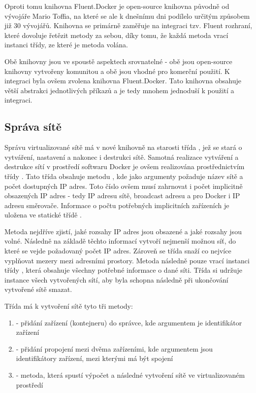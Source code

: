 Oproti tomu knihovna Fluent.Docker je open-source knihovna původně od vývojáře Mario Toffia, na které se ale k dnešnímu dni podílelo určitým způsobem již 30 vývojářů. Knihovna se primárně zaměřuje na integraci tzv. Fluent rozhraní, které dovoluje řetězit metody za sebou, díky tomu, že každá metoda vrací instanci třídy, ze které je metoda volána. \cite{fluentinterface}

Obě knihovny jsou ve spoustě aspektech srovnatelné - obě jsou open-source knihovny vytvořeny komunitou a obě jsou vhodné pro komerční použití. K integraci byla ovšem zvolena knihovna Fluent.Docker. Tato knihovna obsahuje větší abstrakci jednotlivých příkazů a je tedy mnohem jednoduší k použití a integraci.

\subsection{Správa sítě}

Správu virtualizované sítě má v nové knihovně na starosti třída , jež se stará o vytváření, nastavení a nakonec i destrukci sítě. 
Samotná realizace vytváření a destrukce sítí v prostředí softwaru Docker je ovšem realizována prostřednictvím třídy . Tato třída obsahuje metodu , kde jako argumenty požaduje název sítě a počet dostupných IP adres. Toto číslo ovšem musí zahrnovat i počet implicitně obsazených IP adres - tedy IP adresu sítě, broadcast adresu a pro Docker i IP adresu směrovače. Informace o počtu potřebných implicitních zařízeních je uložena ve statické třídě .

Metoda  nejdříve zjistí, jaké rozsahy IP adres jsou obsazené a jaké rozsahy jsou volné. Následně na základě těchto informací vytvoří nejmenší možnou síť, do které se vejde požadovaný počet IP adres. Zároveň se třída snaží co nejvíce vyplňovat mezery mezi adresními prostory. Metoda následně pouze vrací instanci třídy , která obsahuje všechny potřebné informace o dané síti. Třída  si udržuje instance všech vytvořených sítí, aby byla schopna následně při ukončování vytvořené sítě smazat. 

Třída  má k vytvoření sítě tyto tři metody:

\begin{enumerate}
    \item {} - přidání zařízení (kontejneru) do správce, kde argumentem je identifikátor zařízení
    \item {} - přidání propojení mezi dvěma zařízeními, kde argumentem jsou identifikátory zařízení, mezi kterými má být spojení
    \item {} - metoda, která spustí výpočet a následné vytvoření sítě ve virtualizovaném prostředí
\end{enumerate}

